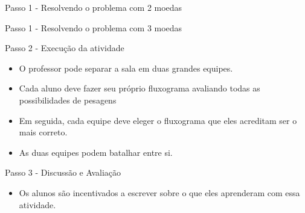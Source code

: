 \documentclass{beamer}
\begin{document}
\begin{frame}{Passo 1 - Resolvendo o problema com 2 moedas}


\end{frame}


\begin{frame}{Passo 1 - Resolvendo o problema com 3 moedas}


\end{frame}


\begin{frame}{Passo 2 - Execução da atividade}

\begin{itemize}

\item <1-> O professor pode separar a sala em duas grandes equipes.

\item <2-> Cada aluno deve fazer seu próprio fluxograma avaliando todas as possibilidades de pesagens  

\item <3-> Em seguida, cada equipe deve eleger o fluxograma que eles acreditam ser o mais correto.

\item <4-> As duas equipes podem batalhar entre si. 



\end{itemize}


\end{frame}







\begin{frame}{Passo 3 - Discussão e Avaliação}

\begin{itemize}

\item<1-> Os alunos são incentivados a escrever sobre o que eles aprenderam com essa atividade.



\end{itemize}


\end{frame}

\end{document}
